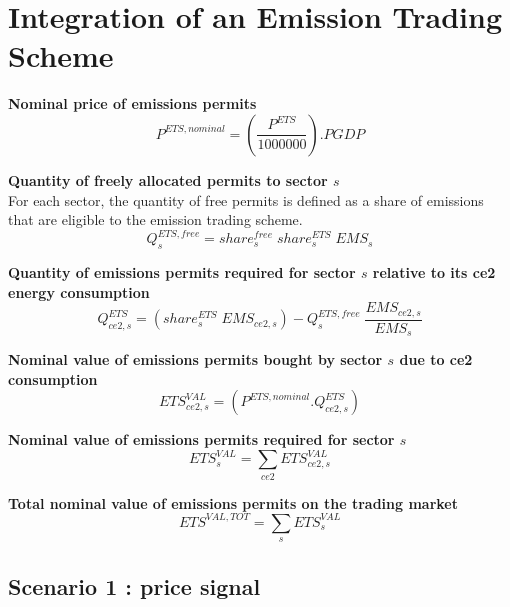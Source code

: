 \documentclass[12pt]{article}
\numberwithin{equation}{section}
\begin{document}
\section{Integration of an Emission Trading Scheme}



\noindent\textbf{Nominal price of emissions permits} \\
\begin{dmath}
P^{ETS,nominal} = \left( \frac{P^{ETS}}{1000000} \right) . PGDP
\end{dmath}

\noindent\textbf{Quantity of freely allocated permits to sector $s$} \\
For each sector, the quantity of free permits is defined as a share of emissions that are eligible to the emission trading scheme. \\
\begin{dmath}
Q^{ETS,free}_{s} = share^{free}_{s} \; share^{ETS}_{s} \; EMS_{s}
\end{dmath}

\noindent\textbf{Quantity of emissions permits required for sector $s$ relative to its ce2 energy consumption} \\
\begin{dmath}
Q^{ETS}_{ce2, s} = \left( share^{ETS}_{s} \; EMS_{ce2, s} \right) - Q^{ETS,free}_{s} \; \frac{EMS_{ce2, s}}{EMS_{s}}
\end{dmath}

\noindent\textbf{Nominal value of emissions permits bought by sector $s$ due to ce2 consumption} \\
\begin{dmath}
ETS^{VAL}_{ce2, s} = \left( P^{ETS,nominal} . Q^{ETS}_{ce2, s} \right)
\end{dmath}

\noindent\textbf{Nominal value of emissions permits required for sector $s$} \\
\begin{dmath}
ETS^{VAL}_{s} = \sum_{ce2} ETS^{VAL}_{ce2, s}
\end{dmath}

\noindent\textbf{Total nominal value of emissions permits on the trading market} \\
\begin{dmath}
ETS^{VAL,TOT} = \sum_{s} ETS^{VAL}_{s}
\end{dmath}



\subsection{Scenario 1 : price signal}
\end{document}
